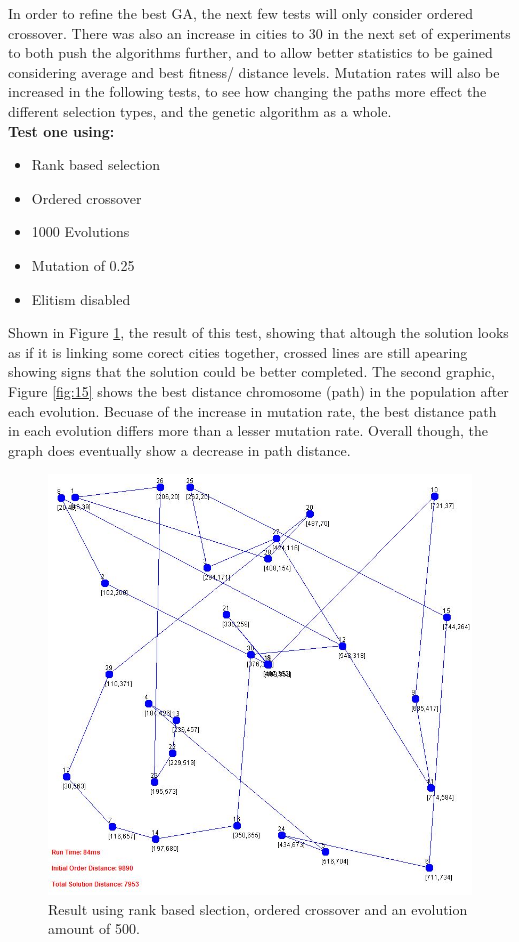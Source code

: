\documentclass[article]{IEEEtran}
\begin{document}
In order to refine the best GA, the next few tests will only consider ordered crossover. There was also an increase in cities to 30 in the next set of experiments to both push the algorithms further, and to allow better statistics to be gained considering average and best fitness/ distance levels. Mutation rates will also be increased in the following tests, to see how changing the paths more effect the different selection types, and the genetic algorithm as a whole.\\

\textbf{Test one using:} 
\begin{itemize}
\item Rank based selection
\item Ordered crossover
\item 1000 Evolutions
\item Mutation of 0.25
\item Elitism disabled
\end{itemize} 

Shown in Figure \ref{fig:14}, the result of this test, showing that altough the solution looks as if it is linking some corect cities together, crossed lines are still apearing showing signs that the solution could be better completed. The second graphic, Figure \ref{fig:15} shows the best distance chromosome (path) in the population after each evolution. Becuase of the increase in mutation rate, the best distance path in each evolution differs more than a lesser mutation rate. Overall though, the graph does eventually show a decrease in path distance.

\begin{figure}[H]
\centering
  \includegraphics[width=.8\linewidth]{images/test1}
  \caption{Result using rank based slection, ordered crossover and an evolution amount of 500.}
  \label{fig:14}
\end{figure}
\end{document}
